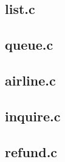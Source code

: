 \documentclass{DateStructure}
\begin{document}
\subsection{list.c}

\subsection{queue.c}

\subsection{airline.c}

\subsection{inquire.c}

\subsection{refund.c}

\end{document}
